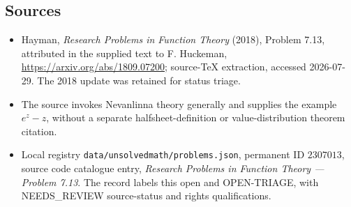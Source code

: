\documentclass[11pt]{article}
\begin{document}
\subsection{Sources}
\begin{itemize}
\item Hayman, \emph{Research Problems in Function Theory} (2018), Problem 7.13, attributed in the supplied text to F. Huckeman, \url{https://arxiv.org/abs/1809.07200}; source-TeX extraction, accessed 2026-07-29. The 2018 update was retained for status triage.
\item The source invokes Nevanlinna theory generally and supplies the example $e^z-z$, without a separate halfsheet-definition or value-distribution theorem citation.
\item Local registry \texttt{data/unsolvedmath/problems.json}, permanent ID $2307013$, source code catalogue entry, \emph{Research Problems in Function Theory --- Problem 7.13}. The record labels this open and OPEN-TRIAGE, with NEEDS\_REVIEW source-status and rights qualifications.
\end{itemize}
\end{document}
